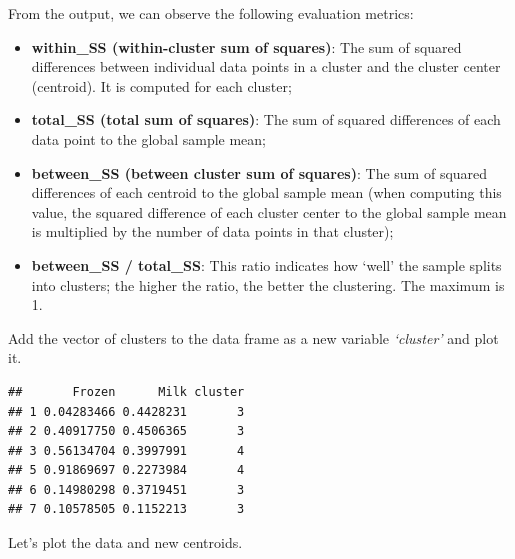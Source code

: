 \documentclass[]{article}
\newenvironment{Shaded}{\begin{snugshade}}{\end{snugshade}}
\newcommand{\KeywordTok}[1]{\textcolor[rgb]{0.13,0.29,0.53}{\textbf{#1}}}
\newcommand{\StringTok}[1]{\textcolor[rgb]{0.31,0.60,0.02}{#1}}
\newcommand{\CommentTok}[1]{\textcolor[rgb]{0.56,0.35,0.01}{\textit{#1}}}
\newcommand{\OperatorTok}[1]{\textcolor[rgb]{0.81,0.36,0.00}{\textbf{#1}}}
\newcommand{\NormalTok}[1]{#1}
\begin{document}
From the output, we can observe the following evaluation metrics:

\begin{itemize}
\item
  \textbf{within\_SS (within-cluster sum of squares)}: The sum of
  squared differences between individual data points in a cluster and
  the cluster center (centroid). It is computed for each cluster;
\item
  \textbf{total\_SS (total sum of squares)}: The sum of squared
  differences of each data point to the global sample mean;
\item
  \textbf{between\_SS (between cluster sum of squares)}: The sum of
  squared differences of each centroid to the global sample mean (when
  computing this value, the squared difference of each cluster center to
  the global sample mean is multiplied by the number of data points in
  that cluster);
\item
  \textbf{between\_SS / total\_SS}: This ratio indicates how `well' the
  sample splits into clusters; the higher the ratio, the better the
  clustering. The maximum is 1.
\end{itemize}

Add the vector of clusters to the data frame as a new variable
\emph{`cluster'} and plot it.

\begin{Shaded}
\end{Shaded}

\begin{verbatim}
##       Frozen      Milk cluster
## 1 0.04283466 0.4428231       3
## 2 0.40917750 0.4506365       3
## 3 0.56134704 0.3997991       4
## 5 0.91869697 0.2273984       4
## 6 0.14980298 0.3719451       3
## 7 0.10578505 0.1152213       3
\end{verbatim}

Let's plot the data and new centroids.
\end{document}

